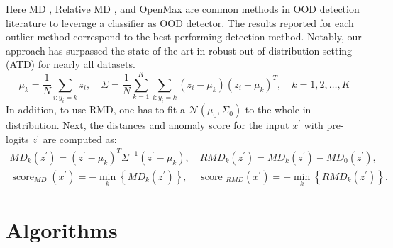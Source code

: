 Here MD \cite{MD}, Relative MD \cite{ren2021simple}, and OpenMax \cite{openmax} are common methods in OOD detection literature to leverage a classifier as OOD detector. The results reported for each outlier method correspond to the best-performing detection method. Notably, our approach has surpassed the state-of-the-art in robust out-of-distribution setting (ATD) for nearly all datasets.
\begin{equation}
\mu_k=\frac{1}{N} \sum_{i: y_i=k} z_i, \quad \Sigma=\frac{1}{N} \sum_{k=1}^K \sum_{i: y_i=k}\left(z_i-\mu_k\right)\left(z_i-\mu_k\right)^T, \quad k=1,2, \ldots, K
\end{equation}
In addition, to use RMD, one has to fit a $\mathcal{N}\left(\mu_0, \Sigma_0\right)$ to the whole in-distribution. Next, the distances and anomaly score for the input $x^{\prime}$ with pre-logits $z^{\prime}$ are computed as:
\begin{equation}
\begin{gathered}
M D_k\left(z^{\prime}\right)=\left(z^{\prime}-\mu_k\right)^T \Sigma^{-1}\left(z^{\prime}-\mu_k\right), \quad R M D_k\left(z^{\prime}\right)=M D_k\left(z^{\prime}\right)-M D_0\left(z^{\prime}\right), \\
\operatorname{score}_{M D}\left(x^{\prime}\right)=-\min _k\left\{M D_k\left(z^{\prime}\right)\right\}, \quad \text { score }_{R M D}\left(x^{\prime}\right)=-\min _k\left\{R M D_k\left(z^{\prime}\right)\right\} .
\end{gathered}
\end{equation}


\newpage


\section{Algorithms}

\algrenewcommand{}
\algrenewcommand{}

